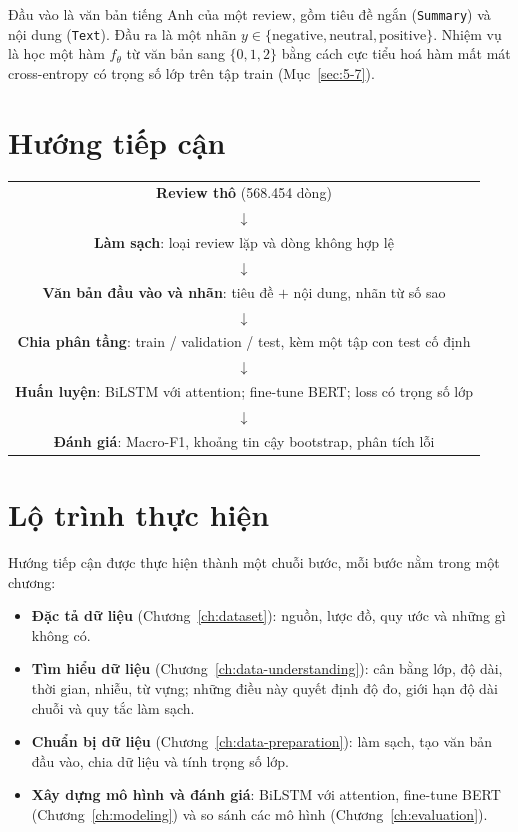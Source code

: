 Đầu vào là văn bản tiếng Anh của một review, gồm tiêu đề ngắn (\texttt{Summary}) và nội dung (\texttt{Text}). Đầu ra là một nhãn $y \in \{\text{negative}, \text{neutral}, \text{positive}\}$. Nhiệm vụ là học một hàm $f_\theta$ từ văn bản sang $\{0,1,2\}$ bằng cách cực tiểu hoá hàm mất mát cross-entropy có trọng số lớp trên tập train (Mục~\ref{sec:5-7}).

\section{Hướng tiếp cận}
\label{sec:2-7}

\begin{center}
\begin{tabular}{@{}c@{}}
    \textbf{Review thô} (568.454 dòng) \\
    $\downarrow$ \\
    \textbf{Làm sạch}: loại review lặp và dòng không hợp lệ \\
    $\downarrow$ \\
    \textbf{Văn bản đầu vào và nhãn}: tiêu đề $+$ nội dung, nhãn từ số sao \\
    $\downarrow$ \\
    \textbf{Chia phân tầng}: train / validation / test, kèm một tập con test cố định \\
    $\downarrow$ \\
    \textbf{Huấn luyện}: BiLSTM với attention; fine-tune BERT; loss có trọng số lớp \\
    $\downarrow$ \\
    \textbf{Đánh giá}: Macro-F1, khoảng tin cậy bootstrap, phân tích lỗi \\
\end{tabular}
\end{center}

\section{Lộ trình thực hiện}
\label{sec:2-8}

Hướng tiếp cận được thực hiện thành một chuỗi bước, mỗi bước nằm trong một chương:

\begin{itemize}
    \item \textbf{Đặc tả dữ liệu} (Chương~\ref{ch:dataset}): nguồn, lược đồ, quy ước và những gì không có.
    \item \textbf{Tìm hiểu dữ liệu} (Chương~\ref{ch:data-understanding}): cân bằng lớp, độ dài, thời gian, nhiễu, từ vựng; những điều này quyết định độ đo, giới hạn độ dài chuỗi và quy tắc làm sạch.
    \item \textbf{Chuẩn bị dữ liệu} (Chương~\ref{ch:data-preparation}): làm sạch, tạo văn bản đầu vào, chia dữ liệu và tính trọng số lớp.
    \item \textbf{Xây dựng mô hình và đánh giá}: BiLSTM với attention, fine-tune BERT (Chương~\ref{ch:modeling}) và so sánh các mô hình (Chương~\ref{ch:evaluation}).
\end{itemize}

